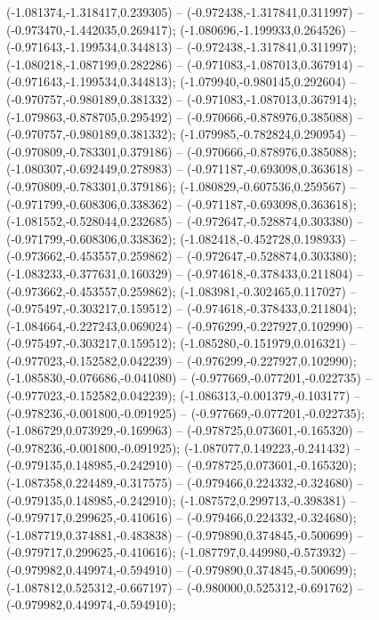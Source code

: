  (-1.081374,-1.318417,0.239305) -- (-0.972438,-1.317841,0.311997) -- (-0.973470,-1.442035,0.269417);
 (-1.080696,-1.199933,0.264526) -- (-0.971643,-1.199534,0.344813) -- (-0.972438,-1.317841,0.311997);
 (-1.080218,-1.087199,0.282286) -- (-0.971083,-1.087013,0.367914) -- (-0.971643,-1.199534,0.344813);
 (-1.079940,-0.980145,0.292604) -- (-0.970757,-0.980189,0.381332) -- (-0.971083,-1.087013,0.367914);
 (-1.079863,-0.878705,0.295492) -- (-0.970666,-0.878976,0.385088) -- (-0.970757,-0.980189,0.381332);
 (-1.079985,-0.782824,0.290954) -- (-0.970809,-0.783301,0.379186) -- (-0.970666,-0.878976,0.385088);
 (-1.080307,-0.692449,0.278983) -- (-0.971187,-0.693098,0.363618) -- (-0.970809,-0.783301,0.379186);
 (-1.080829,-0.607536,0.259567) -- (-0.971799,-0.608306,0.338362) -- (-0.971187,-0.693098,0.363618);
 (-1.081552,-0.528044,0.232685) -- (-0.972647,-0.528874,0.303380) -- (-0.971799,-0.608306,0.338362);
 (-1.082418,-0.452728,0.198933) -- (-0.973662,-0.453557,0.259862) -- (-0.972647,-0.528874,0.303380);
 (-1.083233,-0.377631,0.160329) -- (-0.974618,-0.378433,0.211804) -- (-0.973662,-0.453557,0.259862);
 (-1.083981,-0.302465,0.117027) -- (-0.975497,-0.303217,0.159512) -- (-0.974618,-0.378433,0.211804);
 (-1.084664,-0.227243,0.069024) -- (-0.976299,-0.227927,0.102990) -- (-0.975497,-0.303217,0.159512);
 (-1.085280,-0.151979,0.016321) -- (-0.977023,-0.152582,0.042239) -- (-0.976299,-0.227927,0.102990);
 (-1.085830,-0.076686,-0.041080) -- (-0.977669,-0.077201,-0.022735) -- (-0.977023,-0.152582,0.042239);
 (-1.086313,-0.001379,-0.103177) -- (-0.978236,-0.001800,-0.091925) -- (-0.977669,-0.077201,-0.022735);
 (-1.086729,0.073929,-0.169963) -- (-0.978725,0.073601,-0.165320) -- (-0.978236,-0.001800,-0.091925);
 (-1.087077,0.149223,-0.241432) -- (-0.979135,0.148985,-0.242910) -- (-0.978725,0.073601,-0.165320);
 (-1.087358,0.224489,-0.317575) -- (-0.979466,0.224332,-0.324680) -- (-0.979135,0.148985,-0.242910);
 (-1.087572,0.299713,-0.398381) -- (-0.979717,0.299625,-0.410616) -- (-0.979466,0.224332,-0.324680);
 (-1.087719,0.374881,-0.483838) -- (-0.979890,0.374845,-0.500699) -- (-0.979717,0.299625,-0.410616);
 (-1.087797,0.449980,-0.573932) -- (-0.979982,0.449974,-0.594910) -- (-0.979890,0.374845,-0.500699);
 (-1.087812,0.525312,-0.667197) -- (-0.980000,0.525312,-0.691762) -- (-0.979982,0.449974,-0.594910);
